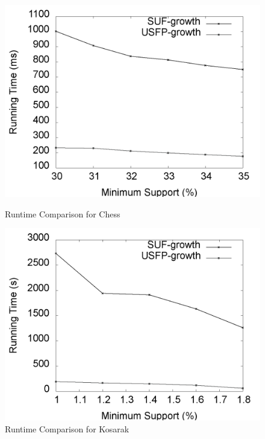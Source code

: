 \documentclass[conference]{IEEEtran}
\begin{document}
\begin{figure}[t]
\begin{minipage}{0.24\linewidth}
		\centering
		\includegraphics[width=\textwidth]{images/result/g_chess_total}
		\caption{Runtime Comparison for Chess}
		\label{result:g_chess_total}
	\end{minipage}%
	\begin{minipage}{0.24\linewidth}
	   \centering
	   \includegraphics[width=\textwidth]{images/result/g_k_total}
	   \caption{Runtime Comparison for Kosarak}
	   \label{result:g_k_total}
	\end{minipage}
\end{figure}
\end{document}
